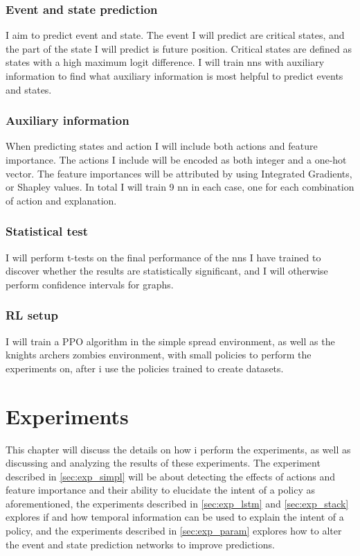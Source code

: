 \documentclass[UKenglish]{uiomasterthesis}
\begin{document}
\subsection{Event and state prediction}
I aim to predict event and state. The event I will predict are critical states, and the part of the state I will predict is future position. Critical states are defined as states with a high maximum logit difference. I will train \acp{nn} with auxiliary information to find what auxiliary information is most helpful to predict events and states. 

\subsection{Auxiliary information}
When predicting states and action I will include both actions and feature importance. The actions I include will be encoded as both integer and a one-hot vector. The feature importances will be attributed by using Integrated Gradients, or Shapley values. In total I will train 9 \ac{nn} in each case, one for each combination of action and explanation.

\subsection{Statistical test}
I will perform t-tests on the final performance of the \acp{nn} I have trained to discover whether the results are statistically significant, and I will otherwise perform confidence intervals for graphs.

\subsection{RL setup}
I will train a PPO algorithm in the simple spread environment, as well as the knights archers zombies environment, with small policies to perform the experiments on, after i use the policies trained to create datasets.

\chapter{Experiments}
\label{chap:exp}
This chapter will discuss the details on how i perform the experiments, as well as discussing and analyzing the results of these experiments. The experiment described in \cref{sec:exp_simpl} will be about detecting the effects of actions and feature importance and their ability to elucidate the intent of a policy as aforementioned, the experiments described in \cref{sec:exp_lstm} and \cref{sec:exp_stack} explores if and how temporal information can be used to explain the intent of a policy, and the experiments described in \cref{sec:exp_param} explores how to alter the event and state prediction networks to improve predictions.
\end{document}
